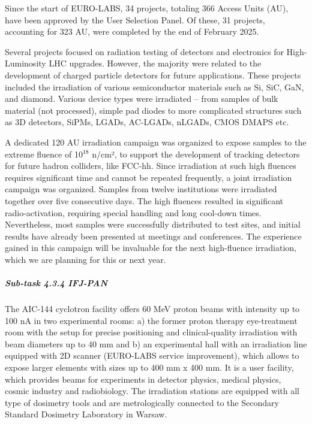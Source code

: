Since the start of EURO-LABS, 34 projects, totaling 366 Access Units (AU), have been approved by the User Selection Panel. Of these, 31 projects, accounting for 323 AU, were completed by the end of February 2025.

Several projects focused on radiation testing of detectors and electronics for High-Luminosity LHC upgrades. However, the majority were related to the development of charged particle detectors for future applications. These projects included the irradiation of various semiconductor materials such as Si, SiC, GaN, and diamond. Various device types were irradiated – from samples of bulk material (not processed), simple pad diodes to more complicated structures such as 3D detectors, SiPMs, LGADs, AC-LGADs, nLGADs, CMOS DMAPS etc.

A dedicated 120 AU irradiation campaign was organized to expose samples to the extreme fluence of 10$^{18}$ n/cm², to support the development of tracking detectors for future hadron colliders, like FCC-hh. Since irradiation at such high fluences requires significant time and cannot be repeated frequently, a joint irradiation campaign was organized. Samples from twelve institutions were irradiated together over five consecutive days. The high fluences resulted in significant radio-activation, requiring special handling and long cool-down times. Nevertheless, most samples were successfully distributed to test sites, and initial results have already been presented at meetings and conferences. The experience gained in this campaign will be invaluable for the next high-fluence irradiation, which we are planning for this or next year.

\subparagraph{Sub-task 4.3.4 IFJ-PAN} \mbox{}

The AIC-144 cyclotron facility offers 60 MeV proton beams with intensity up to 100 nA in two experimental rooms: a) the former proton therapy eye-treatment room with the setup for precise positioning and clinical-quality irradiation with beam diameters up to 40 mm and b) an experimental hall with an irradiation line equipped with 2D scanner (EURO-LABS service improvement), which allows to expose larger elements with sizes up to 400 mm x 400 mm. It is a user facility, which provides beams for experiments in detector physics, medical physics, cosmic industry and radiobiology. The irradiation stations are equipped with all type of dosimetry tools and are metrologically connected to the Secondary Standard Dosimetry Laboratory in Warsaw.

